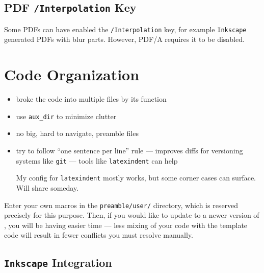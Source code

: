 \subsection{PDF \texorpdfstring{\texttt{/Interpolation}}{/Interpolation} Key}%
\label{sub:PDF Interpolation Key}

Some PDFs can have enabled the \texttt{/Interpolation} key, for example \texttt{Inkscape} generated PDFs with blur parts.
However, PDF/A requires it to be disabled.


\section{Code Organization}%
\label{sec:Code Organization}

\begin{itemize}
    \item broke the code into multiple files by its function
    \item use \verb|aux_dir| to minimize clutter
    \item no big, hard to navigate, preamble files
    \item try to follow \enquote{one sentence per line} rule --- improves diffs for versioning systems like \texttt{git} --- tools like \texttt{latexindent} can help
          \begin{Note}
              My config for \texttt{latexindent} mostly works, but some corner cases can surface.
              Will share someday.
          \end{Note}
\end{itemize}

\begin{remark}
    Enter your own macros in the \texttt{preamble/user/} directory, which is reserved precisely for this purpose.
    Then, if you would like to update to a newer version of \TeXtured{}, you will be having easier time --- less mixing of your code with the template code will result in fewer conflicts you must resolve manually.
\end{remark}


\subsection{\texorpdfstring{\texttt{Inkscape}}{Inkscape} Integration}%
\label{sub:Inkscape Integration}

